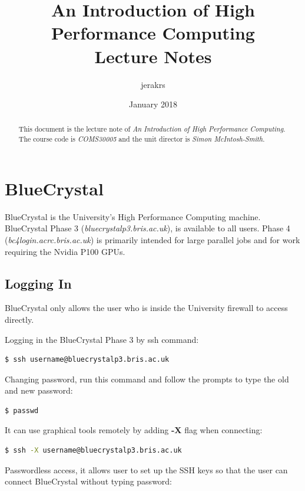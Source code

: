 \documentclass{article}
\title{%
    An Introduction of High Performance Computing \\
    \vspace{0.4cm}
    \large Lecture Notes
}
\author{jerakrs}
\date{January 2018}
\begin{document}
\maketitle

\begin{abstract}
    This document is the lecture note of \textit{An Introduction of High Performance Computing}. The course code is \textit{COMS30005} and the unit director is \textit{Simon McIntosh-Smith}.
\end{abstract}


\section{BlueCrystal}

BlueCrystal is the University's High Performance Computing machine. BlueCrystal Phase 3 (\textit{bluecrystalp3.bris.ac.uk}), is available to all users. Phase 4 (\textit{bc4login.acrc.bris.ac.uk}) is primarily intended for large parallel jobs and for work requiring the Nvidia P100 GPUs.


\subsection{Logging In}

\indent BlueCrystal only allows the user who is inside the University firewall to access directly.

Logging in the BlueCrystal Phase 3 by ssh command:

\begin{lstlisting}[language=Bash]
    $ ssh username@bluecrystalp3.bris.ac.uk
\end{lstlisting}

Changing password, run this command and follow the prompts to type the old and new password:

\begin{lstlisting}[language=Bash]
    $ passwd
\end{lstlisting}

It can use graphical tools remotely by adding \textbf{-X} flag when connecting:

\begin{lstlisting}[language=Bash]
    $ ssh -X username@bluecrystalp3.bris.ac.uk
\end{lstlisting}

Passwordless access, it allows user to set up the SSH keys so that the user can connect BlueCrystal without typing password:
\end{document}
